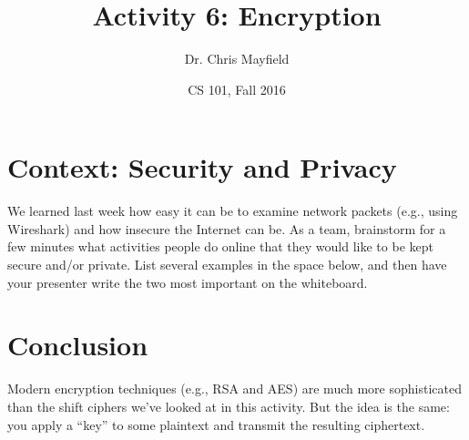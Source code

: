 \documentclass[12pt]{article}
\title{Activity 6: Encryption}
\author{Dr. Chris Mayfield}
\date{CS 101, Fall 2016}
\begin{document}
\maketitle

\section*{Context: Security and Privacy}

We learned last week how easy it can be to examine network packets (e.g., using Wireshark) and how insecure the Internet can be.
As a team, brainstorm for a few minutes what activities people do online that they would like to be kept secure and/or private.
List several examples in the space below, and then have your presenter write the two most important on the whiteboard.

\emptybox





\newpage



\vfill

\section*{Conclusion}

Modern encryption techniques (e.g., RSA and AES) are much more sophisticated than the shift ciphers we've looked at in this activity.
But the idea is the same: you apply a ``key'' to some plaintext and transmit the resulting ciphertext.
\end{document}
